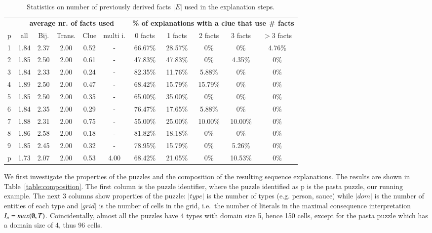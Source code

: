 \begin{table}[t]
	\centering
	\begin{tabular}{l|c|cccc|ccccc}
		& \multicolumn{5}{c|}{\bf average nr. of facts used} & \multicolumn{5}{c}{\bf \% of explanations with a clue that use \# facts}                                                                                \\
		p & all &  Bij. & Trans. &  Clue & multi i. & 0 facts & 1 facts & 2 facts & 3 facts & $>$3 facts \\\hline
		1 &  1.84 &  2.37 &   2.00 &  0.52 &        - &  66.67\% &  28.57\% &   0\% &   0\% &    4.76\% \\
		2 &  1.85 &  2.50 &   2.00 &  0.61 &        - &  47.83\% &  47.83\% &   0\% &   4.35\% &    0\% \\
		3 &  1.84 &  2.33 &   2.00 &  0.24 &        - &  82.35\% &  11.76\% &   5.88\% &   0\% &    0\% \\
		4 &  1.89 &  2.50 &   2.00 &  0.47 &        - &  68.42\% &  15.79\% &  15.79\% &   0\% &    0\% \\
		5 &  1.85 &  2.50 &   2.00 &  0.35 &        - &  65.00\% &  35.00\% &   0\% &   0\% &    0\% \\
		6 &  1.84 &  2.35 &   2.00 &  0.29 &        - &  76.47\% &  17.65\% &   5.88\% &   0\% &    0\% \\
		7 &  1.88 &  2.31 &   2.00 &  0.75 &        - &  55.00\% &  25.00\% &  10.00\% &  10.00\% &    0\% \\
		8 &  1.86 &  2.58 &   2.00 &  0.18 &        - &  81.82\% &  18.18\% &   0\% &   0\% &    0\% \\
		9 &  1.85 &  2.45 &   2.00 &  0.32 &        - &  78.95\% &  15.79\% &   0\% &   5.26\% &    0\% \\
		p &  1.73 &  2.07 &   2.00 &  0.53 &     4.00 &  68.42\% &  21.05\% &   0\% &  10.53\% &    0\% \\
	\end{tabular}
	\caption{Statistics on number of previously derived facts $|E|$ used in the explanation steps.	}
	\label{table:sequence_level}
\end{table}


We first investigate the properties of the puzzles and the composition of the resulting sequence explanations. The results are shown in Table~\ref{table:composition}. The first column is the puzzle identifier, where the puzzle identified as p is the pasta puzzle, our running example. 
The next 3 columns show properties of the puzzle:
$|type|$ is the number of types (e.g. person, sauce) while $|dom|$ is the number of entities of each type and $|grid|$ is the number of cells in the grid, i.e.\ the number of literals in the maximal consequence interpretation $I_n=max(\emptyset, T)$.
Coincidentally, almost all the puzzles have 4 types with domain size 5,  hence 150 cells, except for the pasta puzzle which has a domain size of 4, thus 96 cells.

